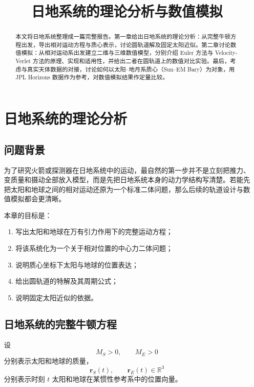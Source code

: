 \documentclass[12pt,a4paper]{ctexrep}
\title{日地系统的理论分析与数值模拟}
\author{}
\date{}
\begin{document}
\maketitle

\begin{abstract}
本文将日地系统整理成一篇完整报告。第一章给出日地系统的理论分析：从完整牛顿方程出发，导出相对运动方程与质心表示，讨论圆轨道解及固定太阳近似。第二章讨论数值模拟：从相对运动系出发建立二维与三维数值模型，分别介绍 Euler 方法与 Velocity-Verlet 方法的原理、实现和适用性，并给出二者在圆轨道上的数值对比实验。最后，考虑与真实天体数据的对接，讨论如何以太阳--地月系质心（Sun--EM Bary）为对象，用 JPL Horizons 数据作为参考，对数值模拟结果作定量比较。
\end{abstract}

\tableofcontents

\chapter{日地系统的理论分析}

\section{问题背景}

为了研究火箭或探测器在日地系统中的运动，最自然的第一步并不是立刻把推力、变质量和摄动全部放入模型，而是先把日地系统本身的动力学结构写清楚。若能先把太阳和地球之间的相对运动还原为一个标准二体问题，那么后续的轨道设计与数值模拟都会更清晰。

本章的目标是：
\begin{enumerate}[label=\arabic*.]
  \item 写出太阳和地球在万有引力作用下的完整运动方程；
  \item 将该系统化为一个关于相对位置的中心力二体问题；
  \item 说明质心坐标下太阳与地球的位置表达；
  \item 给出圆轨道的特解及其周期公式；
  \item 说明固定太阳近似的依据。
\end{enumerate}

\section{日地系统的完整牛顿方程}

设
\[
M_S>0,\qquad M_E>0
\]
分别表示太阳和地球的质量，
\[
\bm r_S(t),\qquad \bm r_E(t)\in \mathbb R^3
\]
分别表示时刻 \(t\) 太阳和地球在某惯性参考系中的位置向量。
\end{document}

